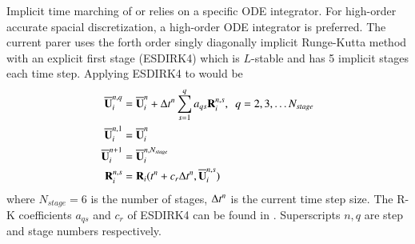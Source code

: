 \documentclass[preprint,12pt]{elsarticle}
\begin{document}
Implicit time marching of  or 
relies on a specific ODE integrator.
For high-order accurate spacial discretization,
a high-order ODE integrator is preferred.
The current parer uses the forth order
singly diagonally implicit Runge-Kutta method with an
explicit first stage (ESDIRK4) \cite{kvaerno2004singly}
which is $L$-stable and has 5 implicit stages each time step.
Applying ESDIRK4 to  would be
\begin{equation}
    \begin{aligned}
        \overline{\mathbf{U}}^{n,q}_i & = \overline{\mathbf{U}}^{n}_i + \mathrm\Delta t^n \sum_{s=1}^q a_{qs} \mathbf{R}^{n,s}_i,\ \ q = 2,3,\dots N_{stage} \\
        \overline{\mathbf{U}}^{n,1}_i & = \overline{\mathbf{U}}^{n}_i                                                               \\
        \overline{\mathbf{U}}^{n+1}_i & = \overline{\mathbf{U}}^{n,N_{stage}}_i                                                             \\
        \mathbf{R}^{n,s}_i  & = \mathbf{R}_i(t^n + c_r \mathrm\Delta t^n, \overline{\mathbf{U}}^{n,s}_i)
    \end{aligned}
\end{equation}
where $N_{stage}=6$ is the number of stages,  $\mathrm\Delta t^n$ is the current
time step size.
The R-K coefficients $a_{qs}$ and $c_r$ of ESDIRK4 can be found
in \cite{kvaerno2004singly}.
Superscripts $n, q$ are step and stage numbers
respectively.
\end{document}
